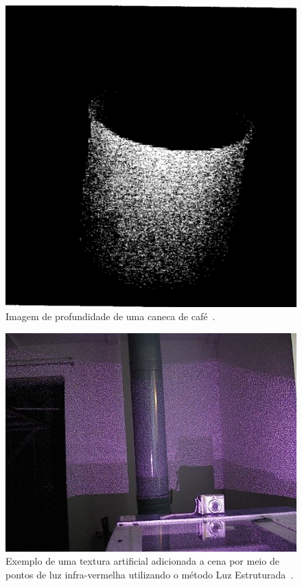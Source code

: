 	\begin{figure}[hbt]
		\begin{center}
			\includegraphics[scale=0.3]{figuras/2.FundamentacaoTeorica/depthimage.png}
		\end{center}
		\caption{Imagem de profundidade de uma caneca de café~\cite{jain}.}
		\label{depthimage}
	\end{figure}

	\begin{figure}[H]
		\begin{center}
			\includegraphics[scale=0.5]{figuras/2.FundamentacaoTeorica/structured-light.jpg}
		\end{center}
		\caption{Exemplo de uma textura artificial adicionada a cena por meio de pontos de luz infra-vermelha utilizando o método Luz Estruturada~\cite{img-strutuctured-light}.}
		\label{fig:structured-light}
	\end{figure}

